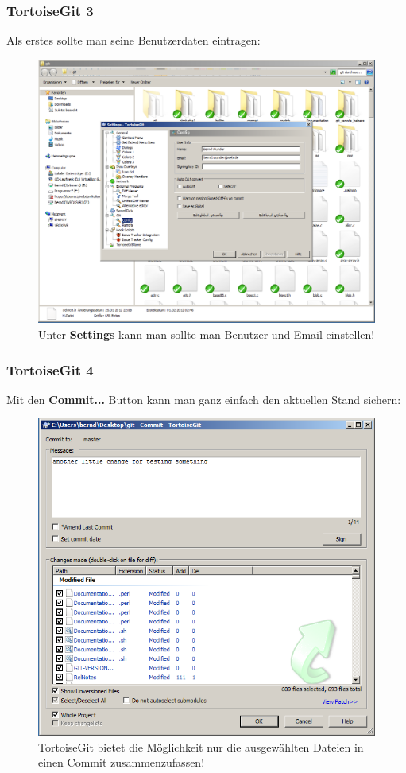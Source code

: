 \documentclass{beamer}
\begin{document}
\begin{frame}\frametitle{TortoiseGit 3}
Als erstes sollte man seine Benutzerdaten eintragen:

\begin{figure}
\includegraphics[scale=0.25]{Bilder/TortoiseGitConfig} 
\caption{Unter \textbf{Settings} kann man sollte man Benutzer und Email einstellen!}
\end{figure}
\end{frame}

\begin{frame}\frametitle{TortoiseGit 4}
Mit den \textbf{Commit...} Button kann man ganz einfach den aktuellen Stand sichern:

\begin{figure}
\includegraphics[scale=0.35]{Bilder/TortoiseGitCommit} 
\caption{TortoiseGit bietet die Möglichkeit nur die ausgewählten Dateien in einen Commit zusammenzufassen!}
\end{figure}
\end{frame}
\end{document}
